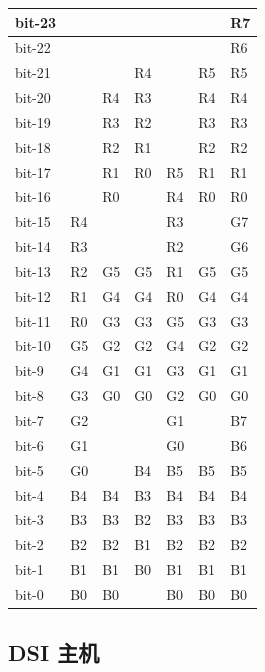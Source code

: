 \documentclass[main\_\_CN.tex]{subfiles}
\begin{document}
\begin{longtable}[c]{ |p{2.5cm}|p{1cm}|p{1cm}|p{1cm}|p{1cm}|p{1cm}|p{1cm}| }
        bit-23 &    &    &    &    &    & R7 \\\hline
        bit-22 &    &    &    &    &    & R6 \\\hline
        bit-21 &    &    & R4 &    & R5 & R5 \\\hline
        bit-20 &    & R4 & R3 &    & R4 & R4 \\\hline
        bit-19 &    & R3 & R2 &    & R3 & R3 \\\hline
        bit-18 &    & R2 & R1 &    & R2 & R2 \\\hline
        bit-17 &    & R1 & R0 & R5 & R1 & R1 \\\hline
        bit-16 &    & R0 &    & R4 & R0 & R0 \\\hline
        bit-15 & R4 &    &    & R3 &    & G7 \\\hline
        bit-14 & R3 &    &    & R2 &    & G6 \\\hline
        bit-13 & R2 & G5 & G5 & R1 & G5 & G5 \\\hline
        bit-12 & R1 & G4 & G4 & R0 & G4 & G4 \\\hline
        bit-11 & R0 & G3 & G3 & G5 & G3 & G3 \\\hline
        bit-10 & G5 & G2 & G2 & G4 & G2 & G2 \\\hline
        bit-9  & G4 & G1 & G1 & G3 & G1 & G1 \\\hline
        bit-8  & G3 & G0 & G0 & G2 & G0 & G0 \\\hline
        bit-7  & G2 &    &    & G1 &    & B7 \\\hline
        bit-6  & G1 &    &    & G0 &    & B6 \\\hline
        bit-5  & G0 &    & B4 & B5 & B5 & B5 \\\hline
        bit-4  & B4 & B4 & B3 & B4 & B4 & B4 \\\hline
        bit-3  & B3 & B3 & B2 & B3 & B3 & B3 \\\hline
        bit-2  & B2 & B2 & B1 & B2 & B2 & B2 \\\hline
        bit-1  & B1 & B1 & B0 & B1 & B1 & B1 \\\hline
        bit-0  & B0 & B0 &    & B0 & B0 & B0 \\\hline
        

\end{longtable}
\normalsize

\subsection{DSI 主机}
\end{document}
